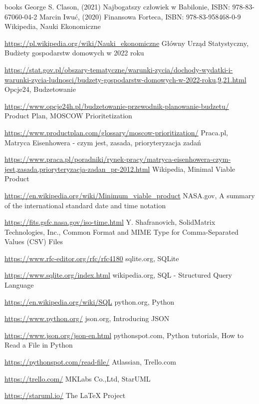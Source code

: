 \documentclass[a4paper,10pt, twoside]{report}
\begin{document}
\begin{thebibliography} {books}
     George S. Clason, (2021) Najbogatszy człowiek w Babilonie, ISBN: 978-83-67060-04-2
     Marcin Iwuć, (2020) Finansowa Forteca, ISBN: 978-83-958468-0-9
     Wikipedia, Nauki Ekonomiczne \raggedright\url{
        https://pl.wikipedia.org/wiki/Nauki_ekonomiczne}
     Główny Urząd Statystyczny, Budżety gospodarstw domowych w 2022 roku \raggedright\url{
        https://stat.gov.pl/obszary-tematyczne/warunki-zycia/dochody-wydatki-i-warunki-zycia-ludnosci/budzety-gospodarstw-domowych-w-2022-roku,9,21.html}
     Opcje24, Budzetowanie \raggedright\url{
        https://www.opcje24h.pl/budzetowanie-przewodnik-planowanie-budzetu/}
     Product Plan, MOSCOW Prioritetization \raggedright\url{
        https://www.productplan.com/glossary/moscow-prioritization/}
    Praca.pl, Matryca Eisenhowera - czym jest, zasada, prioryteryzacja zadań \raggedright\url{
        https://www.praca.pl/poradniki/rynek-pracy/matryca-eisenhowera-czym-jest,zasada,prioryteryzacja-zadan_pr-2012.html}
     Wikipedia, Minimal Viable Product \raggedright\url{
        https://en.wikipedia.org/wiki/Minimum_viable_product}
     NASA.gov, A summary of the international standard date and time notation \raggedright\url{
        https://fits.gsfc.nasa.gov/iso-time.html}
     Y. Shafranovich, SolidMatrix Technologies, Inc., Common Format and MIME Type for Comma-Separated Values (CSV) Files \raggedright\url{
        https://www.rfc-editor.org/rfc/rfc4180}
     sqlite.org, SQLite \raggedright\url{
        https://www.sqlite.org/index.html}
     wikipedia.org, SQL - Structured Query Language \raggedright\url{
        https://en.wikipedia.org/wiki/SQL}
     python.org, Python \raggedright\url{
        https://www.python.org/}
     json.org, Introducing JSON \raggedright\url{
        https://www.json.org/json-en.html}
     pythonspot.com, Python tutorials, How to Read a File in Python \raggedright\url{
        https://pythonspot.com/read-file/}
     Atlassian, Trello.com \raggedright\url{
        https://trello.com/}
     MKLabs Co.,Ltd, StarUML \raggedright\url{
        https://staruml.io/}
     The LaTeX Project \raggedright\url{
}
\end{thebibliography}
\end{document}
